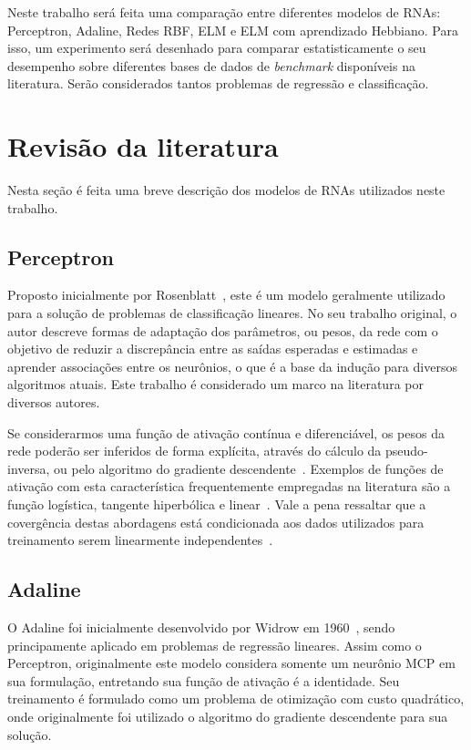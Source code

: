 \documentclass[conference]{IEEEtran}
\begin{document}
	Neste trabalho será feita uma comparação entre diferentes modelos de RNAs: Perceptron, Adaline, Redes RBF, ELM e ELM com aprendizado Hebbiano. Para isso, um experimento será desenhado para comparar estatisticamente o seu desempenho sobre diferentes bases de dados de \textit{benchmark} disponíveis na literatura. Serão considerados tantos problemas de regressão e classificação.
	

	\section{Revisão da literatura}
	Nesta seção é feita uma breve descrição dos modelos de RNAs utilizados neste trabalho.
	
	\subsection{Perceptron}
	Proposto inicialmente por Rosenblatt~\cite{rosenblatt1957perceptron}, este é um modelo geralmente utilizado para a solução de problemas de classificação lineares. No seu trabalho original, o autor descreve formas de adaptação dos parâmetros, ou pesos, da rede com o objetivo de reduzir a discrepância entre as saídas esperadas e estimadas e aprender associações entre os neurônios, o que é a base da indução para diversos algoritmos atuais. Este trabalho é considerado um marco na literatura por diversos autores.
	
	Se considerarmos uma função de ativação contínua e diferenciável, os pesos da rede poderão ser inferidos de forma explícita, através do cálculo da pseudo-inversa, ou pelo algoritmo do gradiente descendente~\cite{hertz1991introduction}. Exemplos de funções de ativação com esta característica frequentemente empregadas na literatura são a função logística, tangente hiperbólica e linear~\cite{jain1996artificial}. Vale a pena ressaltar que a covergência destas abordagens está condicionada aos dados utilizados para treinamento serem linearmente independentes~\cite{hertz1991introduction}.
	
	\subsection{Adaline}
	O Adaline foi inicialmente desenvolvido por Widrow em 1960~\cite{widrow1960adaptive}, sendo principamente aplicado em problemas de regressão lineares. Assim como o Perceptron, originalmente este modelo considera somente um neurônio MCP em sua formulação, entretando sua função de ativação é a identidade. Seu treinamento é formulado como um problema de otimização com custo quadrático, onde originalmente foi utilizado o algoritmo do gradiente descendente para sua solução. 
	
\end{document}
